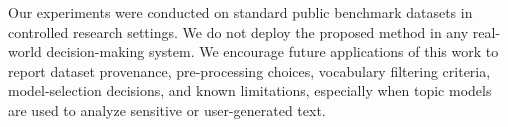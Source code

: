 \documentclass{article}
\theoremstyle{plain}
\theoremstyle{definition}
\theoremstyle{remark}
\begin{document}
Our experiments were conducted on standard public benchmark datasets in controlled research settings. We do not deploy the proposed method in any real-world decision-making system. We encourage future applications of this work to report dataset provenance, pre-processing choices, vocabulary filtering criteria, model-selection decisions, and known limitations, especially when topic models are used to analyze sensitive or user-generated text.







\end{document}
